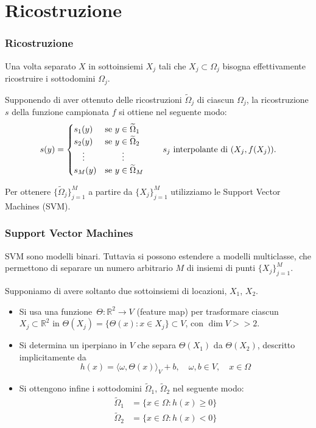 \documentclass[10pt]{beamer}
\theoremstyle{definition}
\theoremstyle{plain}
\def\R{\mathbb R}
\def\hbyw#1#2{\vbox to #1{\vfil \hbox to #2{\hfil}}}
\begin{document}
\section{Ricostruzione}
\begin{frame}
\frametitle{Ricostruzione}
Una volta separato $X$ in sottoinsiemi $X_j$ tali che $X_j\subset\Omega_j$ bisogna effettivamente ricostruire i sottodomini $\Omega_j$.

\bigskip

Supponendo di aver ottenuto delle ricostruzioni $\widetilde\Omega_j$ di ciascun $\Omega_j$, la ricostruzione $s$ della funzione campionata $f$ si ottiene nel seguente modo:
$$
s(y) = \begin{cases}
		s_1(y) & \text{se $y\in\widetilde\Omega_1$}\\
		s_2(y) & \text{se $y\in\widetilde\Omega_2$}\\
		\hbyw{0ex}{1em}\vdots & \hbyw{0ex}{2em}\vdots \\
		s_M(y) & \text{se $y\in\widetilde\Omega_M$}\\
            \end{cases}\qquad\text{$s_j$ interpolante di $(X_j, f(X_j))$.}
$$

\bigskip

Per ottenere $\{\widetilde\Omega_j\}_{j=1}^M$ a partire da $\{X_j\}_{j=1}^M$ utilizziamo le \alert{Support Vector Machines} (SVM). 
\end{frame}



\begin{frame}
\frametitle{Support Vector Machines}
SVM sono modelli binari.  Tuttavia si possono estendere a modelli multiclasse, che permettono di separare un numero arbitrario $M$ di insiemi di punti $\{X_j\}_{j=1}^M$.

\bigskip

Supponiamo di avere soltanto due sottoinsiemi di locazioni, $X_1$, $X_2$.
\begin{itemize}
\item Si usa una funzione~$\Theta:\R^2\to V$ (\alert{feature map}) per trasformare ciascun $X_j\subset\R^2$ in $\Theta(X_j) = \{\Theta(x):x\in X_j\}\subset V$, con $\dim V >> 2$.
\item Si determina un iperpiano in $V$ che separa $\Theta(X_1)$ da $\Theta(X_2)$, descritto implicitamente da
$$
h(x) = \langle \omega, \Theta(x) \rangle_V + b, \quad \omega, b\in V, \quad x\in\Omega
$$
\item Si ottengono infine i sottodomini $\widetilde\Omega_1$, $\widetilde\Omega_2$ nel seguente modo:
$$
\begin{aligned}
\widetilde\Omega_1 &= \{x\in \Omega : h(x) \geq 0\}\\
\widetilde\Omega_2 &= \{x\in \Omega : h(x) < 0\}
\end{aligned}
$$
\end{itemize}
\end{frame}
\end{document}

